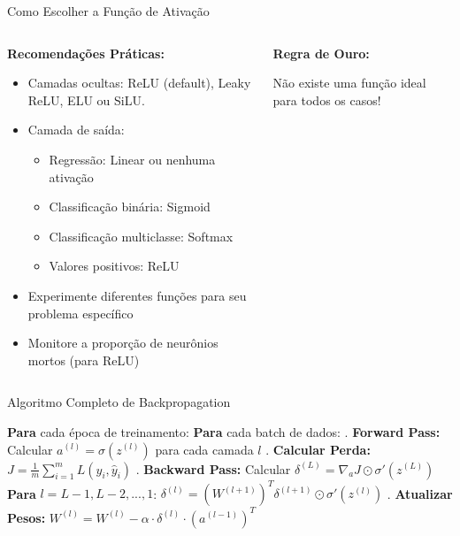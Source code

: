 \documentclass[xcolor=dvipsnames,t,aspectratio=169]{beamer}
\newcommand{\highlight}[1]{{\color{nes_dark_orange} #1}}
\begin{document}
\begin{frame}[c]{Como Escolher a Função de Ativação}
    \begin{columns}[c]
        \begin{column}{0.5\textwidth}
            \textbf{Recomendações Práticas:}
            \begin{itemize}
                \item \highlight{Camadas ocultas:} ReLU (default), Leaky ReLU, ELU ou SiLU.
                \item \highlight{Camada de saída:}
                \begin{itemize}
                    \item Regressão: Linear ou nenhuma ativação
                    \item Classificação binária: Sigmoid
                    \item Classificação multiclasse: Softmax
                    \item Valores positivos: ReLU
                \end{itemize}
                \item Experimente diferentes funções para seu problema específico
                \item Monitore a proporção de neurônios mortos (para ReLU)
            \end{itemize}
        \end{column}
        \begin{column}{0.5\textwidth}
        \textbf{Regra de Ouro:}
            \begin{center}
                \highlight{Não existe uma função ideal para todos os casos!}
            \end{center}
        \end{column}
    \end{columns}
\end{frame}

\begin{frame}[c]{Algoritmo Completo de Backpropagation}
    \begin{display}[Pseudocódigo]
        \begin{algorithmic}
            \STATE \textbf{Para} cada época de treinamento:
            \STATE \quad \textbf{Para} cada batch de dados:
            \STATE \quad {}. \textbf{Forward Pass:}
            \STATE \quad \quad \quad Calcular $a^{(l)} = \sigma(z^{(l)})$ para cada camada $l$
            \STATE \quad {}. \textbf{Calcular Perda:}
            \STATE \quad \quad \quad $J = \frac{1}{m}\sum_{i=1}^{m} L(y_i, \hat{y}_i)$
            \STATE \quad {}. \textbf{Backward Pass:}
            \STATE \quad \quad \quad Calcular $\delta^{(L)} = \nabla_a J \odot \sigma'(z^{(L)})$
            \STATE \quad \quad \quad \textbf{Para} $l = L-1, L-2, ..., 1$:
            \STATE \quad \quad \quad \quad $\delta^{(l)} = (W^{(l+1)})^T \delta^{(l+1)} \odot \sigma'(z^{(l)})$
            \STATE \quad {}. \textbf{Atualizar Pesos:}
            \STATE \quad \quad \quad $W^{(l)} = W^{(l)} - \alpha \cdot \delta^{(l)} \cdot (a^{(l-1)})^T$
        \end{algorithmic}
    \end{display}
\end{frame}
\end{document}
